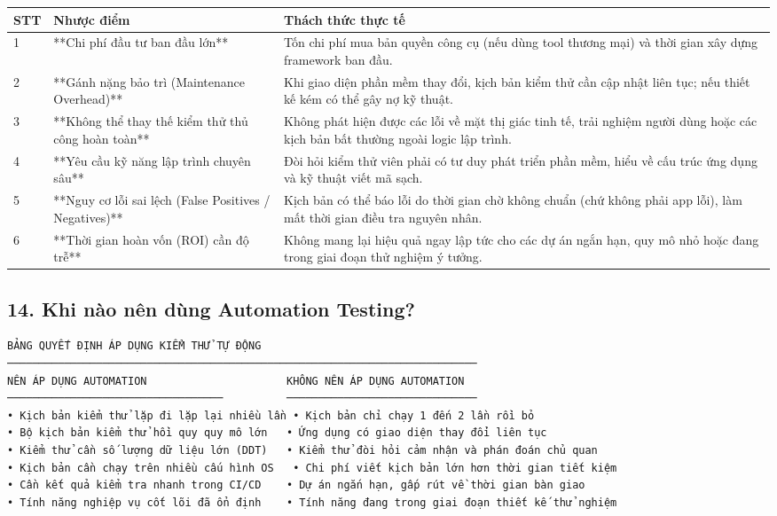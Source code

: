 \begin{table}[H]
\centering
\begin{tabular}{|l|l|l|}
\hline
\textbf{STT} & \textbf{Nhược điểm} & \textbf{Thách thức thực tế} \\ \hline
1 & **Chi phí đầu tư ban đầu lớn** & Tốn chi phí mua bản quyền công cụ (nếu dùng tool thương mại) và thời gian xây dựng framework ban đầu. \\ \hline
2 & **Gánh nặng bảo trì (Maintenance Overhead)** & Khi giao diện phần mềm thay đổi, kịch bản kiểm thử cần cập nhật liên tục; nếu thiết kế kém có thể gây nợ kỹ thuật. \\ \hline
3 & **Không thể thay thế kiểm thử thủ công hoàn toàn** & Không phát hiện được các lỗi về mặt thị giác tinh tế, trải nghiệm người dùng hoặc các kịch bản bất thường ngoài logic lập trình. \\ \hline
4 & **Yêu cầu kỹ năng lập trình chuyên sâu** & Đòi hỏi kiểm thử viên phải có tư duy phát triển phần mềm, hiểu về cấu trúc ứng dụng và kỹ thuật viết mã sạch. \\ \hline
5 & **Nguy cơ lỗi sai lệch (False Positives / Negatives)** & Kịch bản có thể báo lỗi do thời gian chờ không chuẩn (chứ không phải app lỗi), làm mất thời gian điều tra nguyên nhân. \\ \hline
6 & **Thời gian hoàn vốn (ROI) cần độ trễ** & Không mang lại hiệu quả ngay lập tức cho các dự án ngắn hạn, quy mô nhỏ hoặc đang trong giai đoạn thử nghiệm ý tưởng. \\ \hline
\end{tabular}
\end{table}





\subsection{14. Khi nào nên dùng Automation Testing?}

\begin{lstlisting}
BẢNG QUYẾT ĐỊNH ÁP DỤNG KIỂM THỬ TỰ ĐỘNG
──────────────────────────────────────────────────────────────────────────
NÊN ÁP DỤNG AUTOMATION                      KHÔNG NÊN ÁP DỤNG AUTOMATION
──────────────────────────────────          ──────────────────────────────
• Kịch bản kiểm thử lặp đi lặp lại nhiều lần • Kịch bản chỉ chạy 1 đến 2 lần rồi bỏ
• Bộ kịch bản kiểm thử hồi quy quy mô lớn   • Ứng dụng có giao diện thay đổi liên tục
• Kiểm thử cần số lượng dữ liệu lớn (DDT)   • Kiểm thử đòi hỏi cảm nhận và phán đoán chủ quan
• Kịch bản cần chạy trên nhiều cấu hình OS   • Chi phí viết kịch bản lớn hơn thời gian tiết kiệm
• Cần kết quả kiểm tra nhanh trong CI/CD    • Dự án ngắn hạn, gấp rút về thời gian bàn giao
• Tính năng nghiệp vụ cốt lõi đã ổn định    • Tính năng đang trong giai đoạn thiết kế thử nghiệm
\end{lstlisting}


